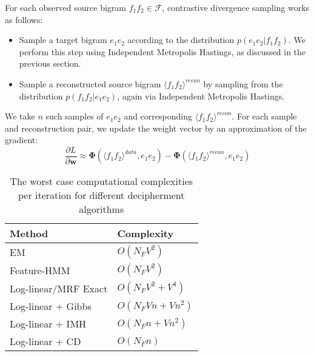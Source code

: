 For each observed source bigram $f_1 f_2 \in \mathcal{F}$, contrastive divergence sampling works as follows:
\begin{itemize}
\item Sample a target bigram $e_1 e_2$ according to the distribution $p(e_1 e_2| f_1 f_2)$. We perform this step using Independent Metropolis Hastings, as discussed in the previous section.
\item Sample a reconstructed source bigram $ \langle f_1 f_2 \rangle^{recon}$ by sampling from the distribution $p(f_1 f_2 | e_1 e_2)$, again via Independent Metropolis Hastings. 
\end{itemize}
We take $n$ such samples of $e_1 e_2$ and corresponding $ \langle f_1 f_2  \rangle^{recon}$. 
For each sample and reconstruction pair, we update the weight vector by an approximation of the gradient:
\begin{equation*}
\frac{\partial L} { \partial \mathbf{w}} \approx  \mathbf{\Phi}(\langle f_1 f_2\rangle^{data}, e_1 e_2) -   \mathbf{\Phi}(\langle f_1 f_2\rangle ^{recon}, e_1 e_2)
 \end{equation*}
\begin{table}
\footnotesize
\begin{tabular}{ | l | l | }
  \hline 
         {Method}  & { Complexity} \\  \hline  \hline
	EM &   $O(N_F V^2)$     \\ \hline 
	Feature-HMM &   $O(N_F V^2)$     \\ \hline 
        Log-linear/MRF Exact  & $O(N_F V^2 + V^4)$   \\ \hline
        Log-linear + Gibbs  & $O(N_F V n + V n^2)$  \\ \hline
        Log-linear + IMH  & $O(N_F n + V n^2)$ \\ \hline
        Log-linear + CD  & $O(N_F n)$ \\ \hline
\end{tabular}
\caption{The worst case computational complexities per iteration for different decipherment algorithms}
\label{table:complexity}
\end{table}
